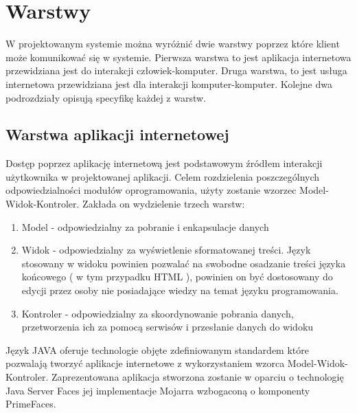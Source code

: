 




\section{Warstwy}
W projektowanym systemie można wyróżnić dwie warstwy poprzez które klient może komunikować się w systemie. Pierwsza warstwa to jest aplikacja internetowa przewidziana jest do interakcji człowiek-komputer. Druga warstwa, to jest usługa internetowa przewidziana jest dla interakcji komputer-komputer. Kolejne dwa podrozdziały opisują specyfikę każdej z warstw.
\subsection{Warstwa aplikacji internetowej}
Dostęp poprzez aplikację internetową jest podstawowym źródłem interakcji użytkownika w projektowanej aplikacji. Celem rozdzielenia poszczególnych odpowiedzialności modułów oprogramowania, użyty zostanie wzorzec Model-Widok-Kontroler. Zakłada on wydzielenie trzech warstw:
\begin{enumerate}
  \item Model - odpowiedzialny za pobranie i enkapsulacje danych
  \item Widok - odpowiedzialny za wyświetlenie sformatowanej treści. Język stosowany w widoku powinien pozwalać na swobodne osadzanie treści języka końcowego ( w tym przypadku HTML ), powinien on być dostosowany do edycji przez osoby nie posiadające wiedzy na temat języku programowania.
  \item Kontroler - odpowiedzialny za skoordynowanie pobrania danych, przetworzenia ich za pomocą serwisów i przesłanie danych do widoku
\end{enumerate}

Język JAVA oferuje technologie objęte zdefiniowanym standardem które pozwalają tworzyć aplikacje internetowe z wykorzystaniem wzorca Model-Widok-Kontroler. Zaprezentowana aplikacja stworzona zostanie w oparciu o technologię Java Server Faces jej implementacje Mojarra wzbogaconą o komponenty PrimeFaces.

